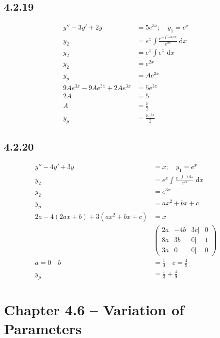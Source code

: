 \documentclass{article}
\begin{document}
\subsection{4.2.19}
\begin{align*}
    y''-3y'+2y &= 5e^{3x}; \quad y_1 = e^{x}\\
    y_2 &= e^{x}\int \frac{e^{-\int -3 \; \mathrm{d}x}}{e^{2x}} \; \mathrm{d}x\\
    y_2 &= e^{x}\int e^{x}\; \mathrm{d}x\\
    y_2 &= e^{2x}\\
    y_p &= Ae^{3x}\\
    9Ae^{3x}-9Ae^{3x}+2Ae^{3x} &= 5e^{3x}\\
    2A &= 5\\
    A &= \frac{5}{2}\\
    y_p &= \frac{5e^{3x}}{2}        
\end{align*}

\subsection{4.2.20}
\begin{align*}
    y''-4y'+3y &= x; \quad y_1 = e^{x}\\
    y_2 &= e^{x}\int \frac{e^{-\int -4 \; \mathrm{d}x}}{e^{2x}} \; \mathrm{d}x\\
    y_2  &= e^{3x}\\
    y_p  &= ax^2+bx+c\\
    2a-4(2ax+b)+3(ax^2+bx+c) &= x\\
    &\begin{pmatrix}2a&-4b&3c|&0\\ 8a & 3b & 0 | & 1 \\ 3a & 0 & 0 |& 0 \end{pmatrix}\\
    a=0 \quad b &= \frac{1}{3} \quad c = \frac{4}{9}\\
    y_p  &= \frac{x}{3}+\frac{4}{9}
\end{align*}


\section{Chapter 4.6 -- Variation of Parameters}
\end{document}
